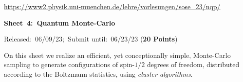 \documentclass[a4paper, 12pt]{article}
\begin{document}
	   
\vspace*{-13mm}
\noindent{}
\hfill
%
\hfill\hfill
\hfill
\begin{center}
	\small \url{https://www2.physik.uni-muenchen.de/lehre/vorlesungen/sose_23/nqp/}
\end{center}
%
\vspace{8mm}
%
\centerline{\Large\textbf{Sheet~4:~Quantum Monte-Carlo}}
%
\vspace{3mm}
%
\normalsize\centerline{Released:~06/09/23;~Submit until:~06/23/23 (\textbf{20 Points})}
%
%
%
\vspace{6mm}
%
On this sheet we realize an efficient, yet conceptionally simple, Monte-Carlo sampling to generate configurations of spin-$1/2$ degrees of freedom, distributed according to the Boltzmann statistics, using \textit{cluster algorithms}.
\end{document}
